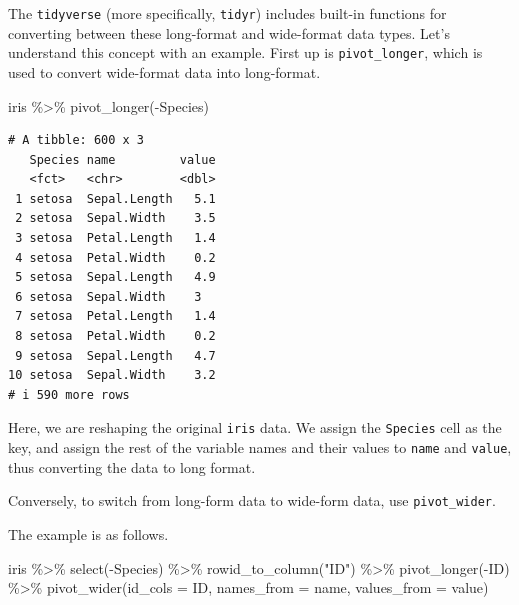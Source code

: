 \documentclass[
  a4paper,
]{book}
\newenvironment{Shaded}{\begin{snugshade}}{\end{snugshade}}
\newcommand{\AttributeTok}[1]{\textcolor[rgb]{0.40,0.45,0.13}{#1}}
\newcommand{\FunctionTok}[1]{\textcolor[rgb]{0.28,0.35,0.67}{#1}}
\newcommand{\NormalTok}[1]{\textcolor[rgb]{0.00,0.23,0.31}{#1}}
\newcommand{\SpecialCharTok}[1]{\textcolor[rgb]{0.37,0.37,0.37}{#1}}
\newcommand{\StringTok}[1]{\textcolor[rgb]{0.13,0.47,0.30}{#1}}
\begin{document}
The \texttt{tidyverse} (more specifically, \texttt{tidyr}) includes
built-in functions for converting between these long-format and
wide-format data types. Let's understand this concept with an example.
First up is \texttt{pivot\_longer}, which is used to convert wide-format
data into long-format.

\begin{Shaded}
\begin{Highlighting}[]
\NormalTok{iris }\SpecialCharTok{\%\textgreater{}\%} \FunctionTok{pivot\_longer}\NormalTok{(}\SpecialCharTok{{-}}\NormalTok{Species)}
\end{Highlighting}
\end{Shaded}

\begin{verbatim}
# A tibble: 600 x 3
   Species name         value
   <fct>   <chr>        <dbl>
 1 setosa  Sepal.Length   5.1
 2 setosa  Sepal.Width    3.5
 3 setosa  Petal.Length   1.4
 4 setosa  Petal.Width    0.2
 5 setosa  Sepal.Length   4.9
 6 setosa  Sepal.Width    3  
 7 setosa  Petal.Length   1.4
 8 setosa  Petal.Width    0.2
 9 setosa  Sepal.Length   4.7
10 setosa  Sepal.Width    3.2
# i 590 more rows
\end{verbatim}

Here, we are reshaping the original \texttt{iris} data. We assign the
\texttt{Species} cell as the key, and assign the rest of the variable
names and their values to \texttt{name} and \texttt{value}, thus
converting the data to long format.

Conversely, to switch from long-form data to wide-form data, use
\texttt{pivot\_wider}.

The example is as follows.

\begin{Shaded}
\begin{Highlighting}[]
\NormalTok{iris }\SpecialCharTok{\%\textgreater{}\%}
  \FunctionTok{select}\NormalTok{(}\SpecialCharTok{{-}}\NormalTok{Species) }\SpecialCharTok{\%\textgreater{}\%}
  \FunctionTok{rowid\_to\_column}\NormalTok{(}\StringTok{"ID"}\NormalTok{) }\SpecialCharTok{\%\textgreater{}\%}
  \FunctionTok{pivot\_longer}\NormalTok{(}\SpecialCharTok{{-}}\NormalTok{ID) }\SpecialCharTok{\%\textgreater{}\%}
  \FunctionTok{pivot\_wider}\NormalTok{(}\AttributeTok{id\_cols =}\NormalTok{ ID, }\AttributeTok{names\_from =}\NormalTok{ name, }\AttributeTok{values\_from =}\NormalTok{ value)}
\end{Highlighting}
\end{Shaded}
\end{document}

